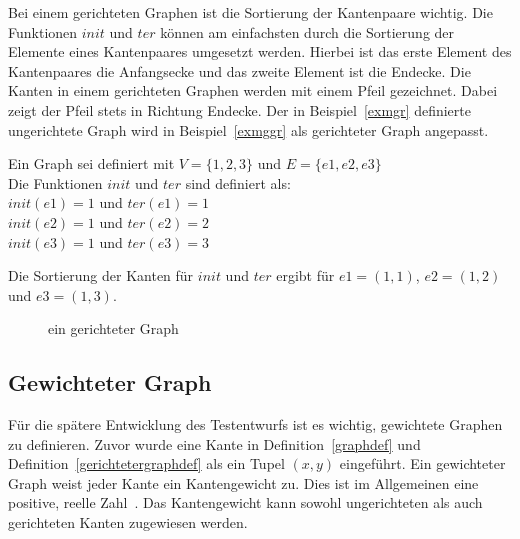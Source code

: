 Bei einem gerichteten Graphen ist die Sortierung der Kantenpaare wichtig.
Die Funktionen $init$ und $ter$ können am einfachsten durch die Sortierung der Elemente eines Kantenpaares umgesetzt werden.
Hierbei ist das erste Element des Kantenpaares die Anfangsecke und das zweite Element ist die Endecke.
Die Kanten in einem gerichteten Graphen werden mit einem Pfeil gezeichnet.
Dabei zeigt der Pfeil stets in Richtung Endecke.
Der in Beispiel~\ref{exmgr} definierte ungerichtete Graph wird in Beispiel~\ref{exmggr} als gerichteter Graph angepasst.

\begin{example}
    \label{exmggr}
    Ein Graph sei definiert mit $V = \{ 1, 2, 3 \}$ und $E = \{e1, e2, e3\}$ \\
    Die Funktionen $init$ und $ter$ sind definiert als: \\
    $init(e1) = 1$ und $ter(e1) = 1$ \\
    $init(e2) = 1$ und $ter(e2) = 2$ \\
    $init(e3) = 1$ und $ter(e3) = 3$ \\
\end{example}

Die Sortierung der Kanten für $init$ und $ter$ ergibt für $e1 = (1,1)$, $e2 = (1,2)$ und $e3 = (1,3)$.

\begin{figure}[H]
    \begin{center}
    \end{center}
    \caption{ein gerichteter Graph}
    \label{graphexample}
\end{figure}

\subsection{Gewichteter Graph}

Für die spätere Entwicklung des Testentwurfs ist es wichtig, gewichtete Graphen zu definieren.
Zuvor wurde eine Kante in Definition~\ref{graphdef} und Definition~\ref{gerichtetergraphdef} als ein Tupel $(x, y)$ eingeführt.
Ein gewichteter Graph weist jeder Kante ein Kantengewicht zu.
Dies ist im Allgemeinen eine positive, reelle Zahl~\cite[vgl. S. 251]{graphentheorie3}.
Das Kantengewicht kann sowohl ungerichteten als auch gerichteten Kanten zugewiesen werden.

